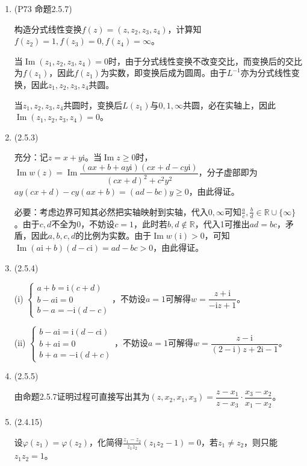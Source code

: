 \documentclass[a4paper,UTF8,fontset=windows]{ctexart}
\DeclareMathOperator{\im}{Im}
\begin{document}
\begin{enumerate}
    \item (P73 命题2.5.7)
    
    构造分式线性变换$f(z)=(z,z_2,z_3,z_4)$，计算知$f(z_2)=1,f(z_3)=0,f(z_4)=\infty$。
    
    当$\im(z_1,z_2,z_3,z_4)=0$时，由于分式线性变换不改变交比，而变换后的交比为$f(z_1)$，因此$f(z_1)$为实数，即变换后成为圆周。由于$L^{-1}$亦为分式线性变换，因此$z_1,z_2,z_3,z_4$共圆。
    
    当$z_1,z_2,z_3,z_4$共圆时，变换后$L(z_1)$与$0,1,\infty$共圆，必在实轴上，因此$\im(z_1,z_2,z_3,z_4)=0$。
    
    \item (2.5.3)
    
    充分：记$z=x+y\mathrm{i}$。当$\im z\ge0$时，$\im w(z)=\im\dfrac{(ax+b+ay\mathrm{i})(cx+d-cy\mathrm{i})}{(cx+d)^2+c^2y^2}$，分子虚部即为$ay(cx+d)-cy(ax+b)=(ad-bc)y\ge0$，由此得证。
    
    必要：考虑边界可知其必然把实轴映射到实轴，代入$0,\infty$可知$\frac{a}{c},\frac{b}{d}\in\mathbb{R}\cup\{\infty\}$。由于$c,d$不全为0，不妨设$c=1$，此时若$b,d\notin\mathbb{R}$，代入1可推出$ad=bc$，矛盾，因此$a,b,c,d$的比例为实数。由于$\im w(\mathrm{i})>0$，可知$\im(a\mathrm{i}+b)(d-c\mathrm{i})=ad-bc>0$，由此得证。
    
    \item (2.5.4)
    
    (i) $\begin{cases}a+b=\mathrm{i}(c+d)\\b-a\mathrm{i}=0\\b-a=-\mathrm{i}(d-c)\end{cases}$，不妨设$a=1$可解得$w=\dfrac{z+\mathrm{i}}{-\mathrm{i}z+1}$。
    
    (ii) $\begin{cases}b-a\mathrm{i}=\mathrm{i}(d-c\mathrm{i})\\b+a\mathrm{i}=0\\b+a=-\mathrm{i}(d+c)\end{cases}$，不妨设$a=1$可解得$w=\dfrac{z-\mathrm{i}}{(2-\mathrm{i})z+2\mathrm{i}-1}$。
    
    \item (2.5.5)
    
    由命题2.5.7证明过程可直接写出其为$(z,x_2,x_1,x_3)=\dfrac{z-x_1}{z-x_3}\cdot\dfrac{x_3-x_2}{x_1-x_2}$。
    
    \item (2.4.15)
    
    设$\varphi(z_1)=\varphi(z_2)$，化简得$\frac{z_1-z_2}{z_1z_2}(z_1z_2-1)=0$，若$z_1\ne z_2$，则只能$z_1z_2=1$。
    

\end{enumerate}
\end{document}
